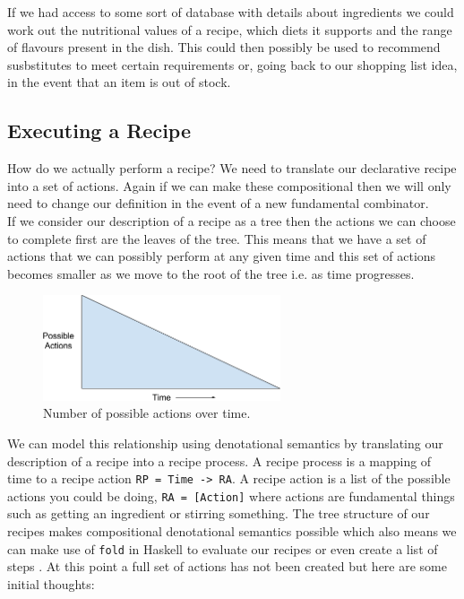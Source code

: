 \documentclass[11pt]{article}
\begin{document}
    If we had access to some sort of database with details about ingredients we could
    work out the nutritional values of a recipe, which diets it supports and the range
    of flavours present in the dish. This could then possibly be used to recommend
    susbstitutes to meet certain requirements or, going back to our shopping list idea,
    in the event that an item is out of stock. \\

    \subsection{Executing a Recipe}

    How do we actually perform a recipe? We need to translate our declarative
    recipe into a set of actions. Again if we can make these compositional
    then we will only need to change our definition in the event of a
    new fundamental combinator. \\
    
    If we consider our description of a recipe as a tree then the actions
    we can choose to complete first are the leaves of the tree. This means
    that we have a set of actions that we can possibly perform at any given
    time and this set of actions becomes smaller as we move to the root of
    the tree i.e. as time progresses. \\

    \begin{figure}[ht]
        \centering
            \includegraphics[width=7cm,keepaspectratio]{actions_time.png}
        \caption{Number of possible actions over time.}
    \end{figure}
    
    We can model this relationship using denotational semantics by translating
    our description of a recipe into a recipe process. A recipe process is a
    mapping of time to a recipe action \texttt{RP = Time -> RA}. A recipe action
    is a list of the possible actions you could be doing, \texttt{RA = [Action]}
    where actions are fundamental things such as getting an ingredient or stirring
    something. The tree structure of our recipes makes compositional denotational
    semantics possible which also means we can make use of \texttt{fold} in Haskell
    to evaluate our recipes or even create a list of steps \cite{hutton-fold}.
    At this point a full set of actions has not been created but here are some
    initial thoughts:
\end{document}
